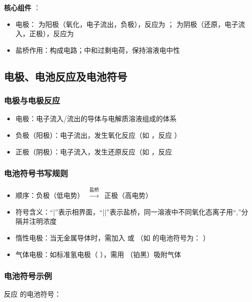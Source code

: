 \textbf{核心组件} ：
\begin{itemize} 
    \item 电极：  为阳极（氧化，电子流出，负极），反应为  ；  为阴极（还原，电子流入，正极），反应为  
    \item 盐桥作用：构成电路；中和过剩电荷，保持溶液电中性
\end{itemize} 

\subsection{电极、电池反应及电池符号} 

\subsubsection{电极与电极反应} 
\begin{itemize} 
    \item 电极：电子流入/流出的导体与电解质溶液组成的体系
    \item 负极（阳极）：电子流出，发生氧化反应（如  ，反应  ）
    \item 正极（阴极）：电子流入，发生还原反应（如  ，反应 
\end{itemize} 

\subsubsection{电池符号书写规则} 
\begin{itemize} 
    \item 顺序：负极（低电势）\ $\xrightarrow{\text{盐桥} } $\ 正极（高电势）
    \item 符号含义：“|”表示相界面，“||”表示盐桥，同一溶液中不同氧化态离子用“,”分隔并注明浓度
    \item 惰性电极：当无金属导体时，需加入  或  （如  的电池符号为：  ）
    \item 气体电极：如标准氢电极（  ），需用  （铂黑）吸附气体
\end{itemize} 

\subsubsection{电池符号示例} 
反应  的电池符号：

